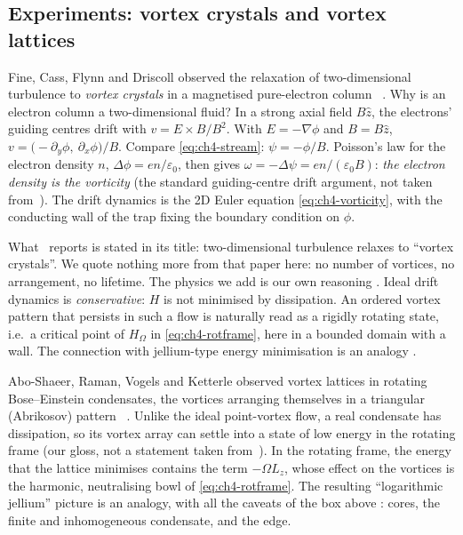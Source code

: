\subsection{Experiments: vortex crystals and vortex lattices}

\begin{physbox}
Fine, Cass, Flynn and Driscoll observed the relaxation of two-dimensional turbulence to \emph{vortex crystals}
in a magnetised pure-electron column~\cite{fine} \tierL. Why is an electron column a two-dimensional fluid? In a
strong axial field $B\hat z$, the electrons' guiding centres drift with $v = E\times B/B^2$. With $E=-\nabla\phi$
and $B=B\hat z$, $v = \bigl(-\partial_y\phi,\ \partial_x\phi\bigr)/B$. Compare \eqref{eq:ch4-stream}:
$\psi = -\phi/B$. Poisson's law for the electron density $n$, $\Delta\phi = en/\varepsilon_0$, then gives
$\omega = -\Delta\psi = en/(\varepsilon_0B)$: \emph{the electron density is the vorticity} \tierC{} (the standard
guiding-centre drift argument, not taken from~\cite{fine}). The drift dynamics is the 2D Euler equation
\eqref{eq:ch4-vorticity}, with the conducting wall of the trap fixing the boundary condition on $\phi$.

What~\cite{fine} reports is stated in its title: two-dimensional turbulence relaxes to ``vortex crystals''. We
quote nothing more from that paper here: no number of vortices, no arrangement, no lifetime. The physics we add is
our own reasoning \tierC. Ideal drift dynamics is \emph{conservative}: $H$ is not minimised by dissipation. An
ordered vortex pattern that persists in such a flow is naturally read as a rigidly rotating state, i.e.\ a
critical point of $H_\Omega$ in \eqref{eq:ch4-rotframe}, here in a bounded domain with a wall. The connection
with jellium-type energy minimisation is an analogy \tierC.
\end{physbox}

\begin{physbox}
Abo-Shaeer, Raman, Vogels and Ketterle observed vortex lattices in rotating Bose--Einstein condensates, the vortices
arranging themselves in a triangular (Abrikosov) pattern~\cite{aboshaeer} \tierL. Unlike the ideal point-vortex
flow, a real condensate has dissipation, so its vortex array can settle into a state of low energy in the rotating
frame \tierC{} (our gloss, not a statement taken from~\cite{aboshaeer}). In the rotating frame, the energy that the
lattice minimises contains the term $-\Omega L_z$, whose effect on the vortices is the harmonic, neutralising bowl
of \eqref{eq:ch4-rotframe}. The resulting ``logarithmic jellium'' picture is an analogy, with all the caveats of the
box above \tierC: cores, the finite and inhomogeneous condensate, and the edge.
\end{physbox}

